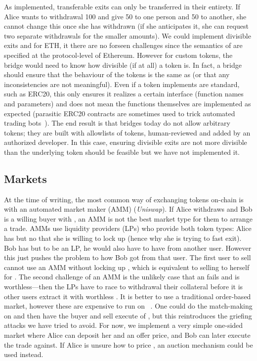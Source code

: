 As implemented, transferable exits can only be transferred in their entirety. If Alice wants to withdrawal 100 \ethtwo and give 50 \ethxx to one person and 50 \ethxx to another, she cannot change this once she has withdrawn (if she anticipates it, she can request two separate withdrawals for the smaller amounts). We could implement divisible exits and for ETH, it there are no forseen challenges since the semantics of \ethone are specified at the protocol-level of Ethereum. However for custom tokens, the bridge would need to know how divisible (if at all) a token is. In fact, a bridge should ensure that the \layertwo behaviour of the tokens is the same as \layerone (or that any inconsistencies are not meaningful). Even if a token implements are standard, such as ERC20, this only ensures it realizes a certain interface (function names and parameters) and does not mean the functions themselves are implemented as expected (parasitic ERC20 contracts are sometimes used to trick automated trading bots~\cite{}). The end result is that bridges today do not allow arbitrary tokens; they are built with allowlists of tokens, human-reviewed and added by an authorized developer. In this case, ensuring divisible exits are not more divisible than the underlying token should be feasible but we have not implemented it.

\subsection{Markets}
\label{sec:uniswap}

At the time of writing, the most common way of exchanging tokens on-chain is with an automated market maker (AMM) (\eg \textit{Uniswap}). If Alice withdraws \ethxx and Bob is a willing buyer with \ethone, an AMM is not the best market type for them to arrange a trade. AMMs use liquidity providers (LPs) who provide both token types: Alice has \ethxx but no \ethone that she is willing to lock up (hence why she is trying to fast exit). Bob has \ethone but to be an LP, he would also have to have \ethxx from another user. However this just pushes the problem to how Bob got \ethxx from that user. The first user to sell \ethxx cannot use an AMM without locking up \ethone, which is equivalent to selling \ethxx to herself for \ethone. The second challenge of an AMM is the unlikely case that an \rblock fails and \ethxx is worthless---then the LPs have to race to withdrawal their collateral before it is other users extract it with worthless \ethxx. It is better to use a traditional order-based market, however these are expensive to run on \layerone~\cite{moosavi2021lissy}. One could do the match-making on \layertwo and then have the buyer and sell execute of \layerone, but this reintroduces the griefing attacks we have tried to avoid. For now, we implement a very simple one-sided market where Alice can deposit her \ethxx and an offer price, and Bob can later execute the trade against. If Alice is unsure how to price \ethxx, an auction mechanism could be used instead. 


